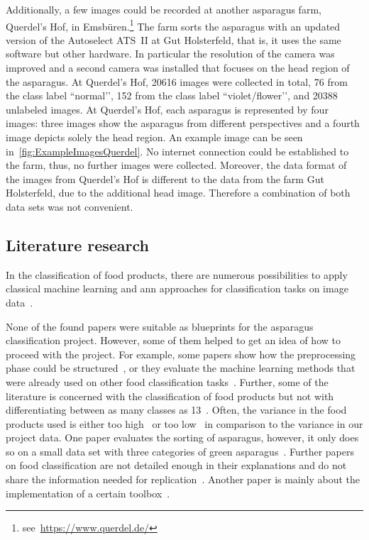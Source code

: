 Additionally, a few images could be recorded at another asparagus farm, Querdel’s Hof, in Emsb{\"u}ren.\footnote{see~\url{https://www.querdel.de/}} The farm sorts the asparagus with an updated version of the Autoselect ATS~II at Gut Holsterfeld, that is, it uses the same software but other hardware. In particular the resolution of the camera was improved and a second camera was installed that focuses on the head region of the asparagus. At Querdel’s Hof, 20616 images were collected in total, 76 from the class label ``normal’’, 152 from the class label ``violet/flower’’, and 20388 unlabeled images. At Querdel’s Hof, each asparagus is represented by four images: three images show the asparagus from different perspectives and a fourth image depicts solely the head region. An example image can be seen in~\autoref{fig:ExampleImagesQuerdel}. No internet connection could be established to the farm, thus, no further images were collected. Moreover, the data format of the images from Querdel’s Hof is different to the data from the farm Gut Holsterfeld, due to the additional head image. Therefore a combination of both data sets was not convenient. 


\subsection{Literature research}
\label{sec:Literature}

In the classification of food products, there are numerous possibilities to apply classical machine learning and \acrshort{ann} approaches for classification tasks on image data~\citep{bhargava2018fruits,brosnan2002inspection}.

None of the found papers were suitable as blueprints for the asparagus classification project. However, some of them helped to get an idea of how to proceed with the project. For example, some papers show how the preprocessing phase could be structured~\citep{mery2013automated}, or they evaluate the machine learning methods that were already used on other food classification tasks~\citep{bhargava2018fruits}. Further, some of the literature is concerned with the classification of food products but not with differentiating between as many classes as 13~\citep{diaz2004comparison,kilicc2007classification}. Often, the variance in the food products used is either too high~\citep{zhang2012classification} or too low~\citep{kilicc2007classification,al2011dates} in comparison to the variance in our project data.  One paper evaluates the sorting of asparagus, however, it only does so on a small data set with three categories of green asparagus~\citep{donis2016classification}. Further papers on food classification are not detailed enough in their explanations and do not share the information needed for replication~\citep{pedreschi2016grading}. Another paper is mainly about the implementation of a certain toolbox~\citep{mery2013automated}.

